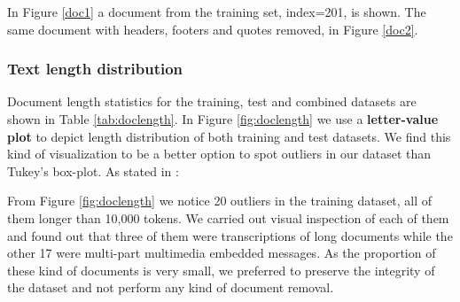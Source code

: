 \documentclass[10pt,journal,compsoc, onecolumn]{IEEEtran}
\begin{document}
In Figure \ref{doc1} a document from the training set, index=201, is shown. The same document with headers, footers and quotes removed, in Figure \ref{doc2}.

\subsubsection{Text length distribution}

Document length statistics for the training, test and combined datasets are shown in Table \ref{tab:doclength}.  In Figure \ref{fig:doclength} we use a \textbf{letter-value plot} \cite{letter-value-plot} to depict length distribution of both training and test datasets. We find this kind of visualization to be a better option to spot outliers in our dataset than Tukey's box-plot. As stated in \cite{letter-value-plot}: 


From Figure \ref{fig:doclength} we notice 20 outliers in the training dataset, all of them longer than 10,000 tokens. We carried out visual inspection of each of them and found out that three of them were transcriptions of long documents while the other 17 were multi-part multimedia embedded messages. As the proportion of these kind of documents is very small, we preferred to preserve the integrity of the dataset and not perform any kind of document removal.

\begin{table}[h]
\caption{Document length statistics (num. of tokens)}
\label{tab:doclength}
\begin{center}
\end{center}
\end{table}
\end{document}

